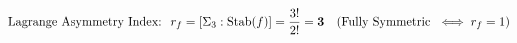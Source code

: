 \documentclass[preview]{standalone}
\begin{document}
\begin{align*}
\special{dvisvgm:raw <g id='unique000'>}\text{Lagrange Asymmetry Index: }\; r_f = [\Sigma_3 : \operatorname{Stab}(f)] = \frac{3!}{2!} = \mathbf{3} \quad (\text{Fully Symmetric }\iff r_f = 1)\special{dvisvgm:raw </g>}
\end{align*}
\end{document}
